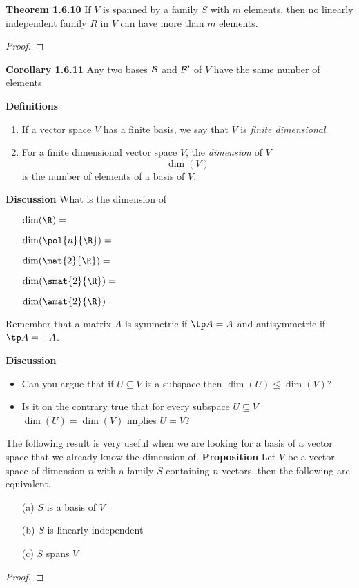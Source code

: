 \documentclass[letterpaper, 10pt]{article}
\begin{document}
\lb
\textbf{Theorem 1.6.10} 
\lb
If $V$ is spanned by a family $S$ with $m$ elements, then no linearly
independent family $R$ in $V$ can have more than $m$ elements.
\begin{proof}
    
\end{proof}


\lb
\textbf{Corollary 1.6.11}
\lb
Any two bases $\cal B$ and $\cal B'$ of $V$ have the same number of elements



\lb
\textbf{Definitions} 
\begin{enumerate}
    \item If a vector space $V$ has a finite basis, we say that $V$ is
        \emph{finite dimensional}.
    \item For a finite dimensional vector space $V$, the \emph{dimension}
        of $V$
        \[ \dim(V) \]
        is the number of elements of a basis of $V$.
\end{enumerate}



\lb
\textbf{Discussion} 
\lb
What is the dimension of 
\begin{enumerate}
    \item[] $\dim( \R ) = $
    \item[] $\dim( \pol{n}{\R} ) = $
    \item[] $\dim( \mat{2}{\R} ) = $
    \item[] $\dim( \smat{2}{\R} ) = $
    \item[] $\dim( \amat{2}{\R} ) = $
\end{enumerate}
\lb
Remember that a matrix $A$ is symmetric if $\tp A = A$ and antisymmetric if $\tp A = -A$.



\lb
\textbf{Discussion}
\begin{itemize}
    \item
    Can you argue that if $U \subseteq V$ is a subspace then $\dim (U) \leq \dim(V)$?
    \item
    Is it on the contrary true that for every subspace $U \subseteq V$
    $\dim(U) = \dim(V)$ implies  $U = V$?
\end{itemize}




\newpage
\lb
The following result is very useful when we are looking for a basis
of a vector space that we already know the dimension of.
\lb
\textbf{Proposition}
\lb
Let $V$ be a vector space of dimension $n$ with a family $S$ containing $n$ vectors,
then the following are equivalent.
\begin{enumerate}
    \item[(a)]
        $S$ is a basis of $V$
    \item[(b)]
        $S$ is linearly independent
    \item[(c)]
        $S$ spans $V$
\end{enumerate}
\begin{proof}
\end{proof}
\end{document}
